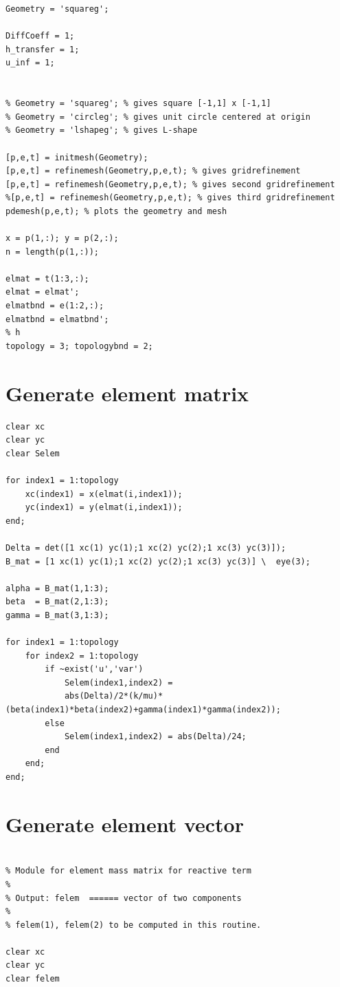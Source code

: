 \documentclass[a4paper]{report}
\begin{document}
\begin{appendices}
\begin{lstlisting}
Geometry = 'squareg'; 

DiffCoeff = 1;
h_transfer = 1;
u_inf = 1;


% Geometry = 'squareg'; % gives square [-1,1] x [-1,1]
% Geometry = 'circleg'; % gives unit circle centered at origin
% Geometry = 'lshapeg'; % gives L-shape

[p,e,t] = initmesh(Geometry);
[p,e,t] = refinemesh(Geometry,p,e,t); % gives gridrefinement
[p,e,t] = refinemesh(Geometry,p,e,t); % gives second gridrefinement
%[p,e,t] = refinemesh(Geometry,p,e,t); % gives third gridrefinement
pdemesh(p,e,t); % plots the geometry and mesh

x = p(1,:); y = p(2,:);
n = length(p(1,:));

elmat = t(1:3,:);
elmat = elmat';
elmatbnd = e(1:2,:);
elmatbnd = elmatbnd';
% h
topology = 3; topologybnd = 2;
\end{lstlisting}




\section{Generate element matrix}
\begin{lstlisting}
clear xc
clear yc
clear Selem

for index1 = 1:topology
	xc(index1) = x(elmat(i,index1));
	yc(index1) = y(elmat(i,index1));
end;

Delta = det([1 xc(1) yc(1);1 xc(2) yc(2);1 xc(3) yc(3)]);
B_mat = [1 xc(1) yc(1);1 xc(2) yc(2);1 xc(3) yc(3)] \  eye(3);

alpha = B_mat(1,1:3);
beta  = B_mat(2,1:3);
gamma = B_mat(3,1:3);

for index1 = 1:topology
	for index2 = 1:topology
		if ~exist('u','var')
			Selem(index1,index2) =
			abs(Delta)/2*(k/mu)*(beta(index1)*beta(index2)+gamma(index1)*gamma(index2));
		else
			Selem(index1,index2) = abs(Delta)/24;
		end
	end;
end;
\end{lstlisting}

\section{Generate element vector}
\begin{lstlisting}

% Module for element mass matrix for reactive term
%
% Output: felem  ====== vector of two components
%
% felem(1), felem(2) to be computed in this routine.

clear xc
clear yc
clear felem


\end{lstlisting}
\end{appendices}
\end{document}
